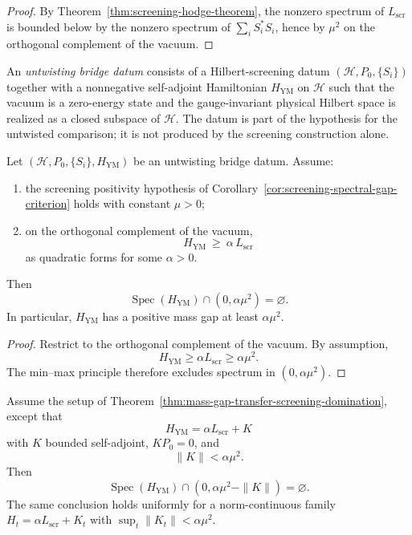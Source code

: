\begin{proof}
By Theorem~\ref{thm:screening-hodge-theorem}, the nonzero spectrum of $L_{\mathrm{scr}}$ is bounded below by the
nonzero spectrum of $\sum_i S_i^*S_i$, hence by $\mu^2$ on the orthogonal complement of the vacuum.
\end{proof}

\begin{definition}
An \emph{untwisting bridge datum} consists of a Hilbert-screening datum $(\mathcal H,P_0,\{S_i\})$
together with a nonnegative self-adjoint Hamiltonian $H_{\mathrm{YM}}$ on $\mathcal H$ such that the vacuum
is a zero-energy state and the gauge-invariant physical Hilbert space is realized as a closed subspace of $\mathcal H$.
The datum is part of the hypothesis for the untwisted comparison; it is not produced by the screening
construction alone.
\end{definition}

\begin{theorem}
\label{thm:mass-gap-transfer-screening-domination}
Let $(\mathcal H,P_0,\{S_i\},H_{\mathrm{YM}})$ be an untwisting bridge datum.
Assume:
\begin{enumerate}[label=(\alph*)]
\item the screening positivity hypothesis of Corollary~\ref{cor:screening-spectral-gap-criterion} holds with constant $\mu>0$;
\item on the orthogonal complement of the vacuum,
\[
H_{\mathrm{YM}}\ \ge\ \alpha\, L_{\mathrm{scr}}
\]
as quadratic forms for some $\alpha>0$.
\end{enumerate}
Then
\[
\operatorname{Spec}(H_{\mathrm{YM}})\cap (0,\alpha\mu^2)=\varnothing.
\]
In particular, $H_{\mathrm{YM}}$ has a positive mass gap at least $\alpha\mu^2$.
\end{theorem}

\begin{proof}
Restrict to the orthogonal complement of the vacuum. By assumption,
\[
H_{\mathrm{YM}}\ge \alpha L_{\mathrm{scr}} \ge \alpha\mu^2.
\]
The min--max principle therefore excludes spectrum in $(0,\alpha\mu^2)$.
\end{proof}

\begin{corollary}
Assume the setup of Theorem~\ref{thm:mass-gap-transfer-screening-domination}, except that
\[
H_{\mathrm{YM}} = \alpha L_{\mathrm{scr}} + K
\]
with $K$ bounded self-adjoint, $KP_0=0$, and
\[
\|K\|<\alpha\mu^2.
\]
Then
\[
\operatorname{Spec}(H_{\mathrm{YM}})\cap (0,\alpha\mu^2-\|K\|)=\varnothing.
\]
The same conclusion holds uniformly for a norm-continuous family $H_t=\alpha L_{\mathrm{scr}}+K_t$ with
$\sup_t\|K_t\|<\alpha\mu^2$.
\end{corollary}

